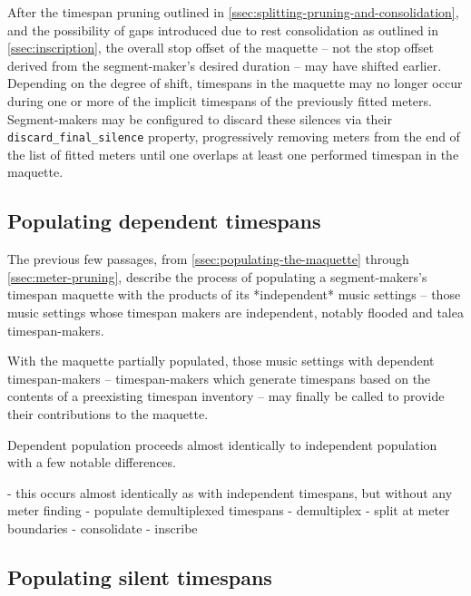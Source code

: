After the timespan pruning outlined in
\autoref{ssec:splitting-pruning-and-consolidation}, and the possibility of gaps
introduced due to rest consolidation as outlined in \autoref{ssec:inscription},
the overall stop offset of the maquette -- not the stop offset derived from the
segment-maker's desired duration -- may have shifted earlier. Depending on the
degree of shift, timespans in the maquette may no longer occur during one or
more of the implicit timespans of the previously fitted meters. Segment-makers
may be configured to discard these silences via their
\texttt{discard\_final\_silence} property, progressively removing meters from
the end of the list of fitted meters until one overlaps at least one performed
timespan in the maquette.

\subsection{Populating dependent timespans}
\label{ssec:populating-dependent-timespans}

The previous few passages, from \autoref{ssec:populating-the-maquette} through
\autoref*{ssec:meter-pruning}, describe the process of populating a
segment-makers's timespan maquette with the products of its *independent* music
settings -- those music settings whose timespan makers are independent, notably
flooded and talea timespan-makers.

With the maquette partially populated, those music settings with dependent
timespan-makers -- timespan-makers which generate timespans based on the
contents of a preexisting timespan inventory -- may finally be called to
provide their contributions to the maquette.

Dependent population proceeds almost identically to independent population with
a few notable differences.

\begin{markdown}
-   this occurs almost identically as with independent timespans,
    but without any meter finding
-   populate demultiplexed timespans
-   demultiplex
-   split at meter boundaries
-   consolidate
-   inscribe
\end{markdown}

\subsection{Populating silent timespans}
\label{ssec:populating-silent-timespans}

